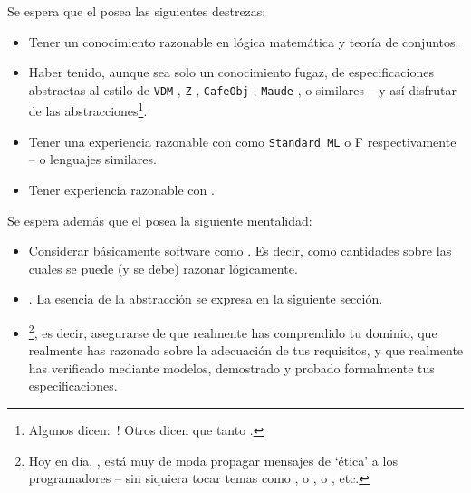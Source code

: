 \begynd
\pind Se espera que el  posea las
      siguientes destrezas:
\afslut
\begin{itemize}
\item Tener un conocimiento razonable en  lógica matemática
  y teoría de conjuntos.
\item Haber tenido, aunque sea solo un conocimiento fugaz, de especificaciones abstractas al estilo de
  \texttt{VDM} \citevdm,
  \texttt{Z} \citez,
  \texttt{CafeObj} \citecafeobj, 
  \texttt{Maude} \cite{maude-primer,maude-manual}, o similares -- y así
  disfrutar de las abstracciones\footnote{Algunos dicen: \,! Otros dicen que tanto .}.
\item Tener una experiencia razonable con  como \texttt{Standard ML} o \textsf{F}
      \cite{MilnerTofte,Harper,MRHansen+HRischel} respectivamente
      \cite{Hansen+Rischel} -- o lenguajes similares.
    \item Tener experiencia razonable con 
      \cite{Hoa78,Hoare85,Hoare85+2004,Roscoe97,Schneider99}.
\end{itemize}
\noindent
\begynd
\pind Se espera además que el  posea
      la siguiente mentalidad:
\afslut
\begin{itemize}
\item Considerar básicamente software como . Es decir, como cantidades sobre las cuales se puede (y se debe) razonar lógicamente.
  \item {}. La esencia de
  la abstracción se expresa en la siguiente sección.

\item {}\footnote{Hoy en día, \todaytime, 
    está muy de moda propagar mensajes de `ética' a los programadores
    -- sin siquiera tocar temas como , o
    ,
    o , etc.}, es decir, asegurarse de que 
    realmente has comprendido tu dominio, que realmente has razonado
    sobre la adecuación de tus requisitos, y que realmente has
    verificado mediante modelos, demostrado y probado formalmente tus
    especificaciones.
\end{itemize}

